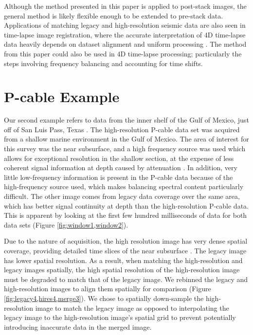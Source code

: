     Although the method presented in this paper is applied to post-stack images, the general method is likely flexible enough to be extended to pre-stack data.
    Applications of matching legacy and high-resolution seismic data are also seen in time-lapse image registration, where the accurate interpretation of 4D time-lapse data heavily depends on dataset alignment and uniform processing \cite[]{nonuniform}.
    The method from this paper could also be used in 4D time-lapse processing; particularly the steps involving frequency balancing and accounting for time shifts.
    
\section{P-cable Example}
    Our second example refers to data from the inner shelf of the Gulf of Mexico, just off of San Luis Pass, Texas \cite[]{data}.
    The high-resolution P-cable data set was acquired from a shallow marine environment in the Gulf of Mexico. 
    The area of interest for this survey was the near subsurface, and a high frequency source was used which allows for exceptional resolution in the shallow section, at the expense of less coherent signal information at depth caused by attenuation \cite[]{tip}. 
    In addition, very little low-frequency information is present in the P-cable data because of the high-frequency source used, which makes balancing spectral content particularly difficult. 
    The other image comes from legacy data coverage over the same area, which has better signal continuity at depth than the high-resolution P-cable data. 
    This is apparent by looking at the first few hundred milliseconds of data for both data sets 
    (Figure \ref{fig:window1,window2}).

    
    Due to the nature of acquisition, the high resolution image has very dense spatial coverage, 
    providing detailed time slices of the near subsurface \cite[]{tip}. 
    The legacy image has lower spatial resolution. 
    As a result, when matching the high-resolution and legacy images spatially, the high spatial resolution of the high-resolution image must be degraded to match that of the legacy image. 
    We rebinned the legacy and high-resolution images to align them spatially for comparison (Figure \ref{fig:legacy4,hires4,merge3}).
    We chose to spatially down-sample the high-resolution image to match the legacy image as opposed to interpolating the legacy image to the high-resolution image's spatial grid to prevent potentially introducing inaccurate data in the merged image.
    
